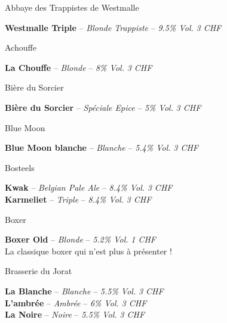 \documentclass{resume} %
\begin{document}
	\begin{rSection}{Abbaye des Trappistes de Westmalle}

	{\bf Westmalle Triple} – {\em Blonde Trappiste } – {\em 9.5\% Vol.} \hfill {\em 3 CHF} \\

	\end{rSection}

	\begin{rSection}{Achouffe}

	{\bf La Chouffe} – {\em Blonde } – {\em 8\% Vol.} \hfill {\em 3 CHF} \\

	\end{rSection}

	\begin{rSection}{Bière du Sorcier}

	{\bf Bière du Sorcier} – {\em Spéciale Epice } – {\em 5\% Vol.} \hfill {\em 3 CHF} \\

	\end{rSection}

	\begin{rSection}{Blue Moon}

	{\bf Blue Moon blanche} – {\em Blanche } – {\em 5.4\% Vol.} \hfill {\em 3 CHF} \\

	\end{rSection}

	\begin{rSection}{Bosteels}

	{\bf Kwak} – {\em Belgian Pale Ale } – {\em 8.4\% Vol.} \hfill {\em 3 CHF} \\

	{\bf Karmeliet} – {\em Triple } – {\em 8.4\% Vol.} \hfill {\em 3 CHF} \\

	\end{rSection}

	\begin{rSection}{Boxer}

	{\bf Boxer Old} – {\em Blonde } – {\em 5.2\% Vol.} \hfill {\em 1 CHF} \\
	La classique boxer qui n'est plus à présenter ! \\

	\end{rSection}

	\begin{rSection}{Brasserie du Jorat}

	{\bf La Blanche} – {\em Blanche } – {\em 5.5\% Vol.} \hfill {\em 3 CHF} \\

	{\bf L'ambrée} – {\em Ambrée } – {\em 6\% Vol.} \hfill {\em 3 CHF} \\

	{\bf La Noire} – {\em Noire } – {\em 5.5\% Vol.} \hfill {\em 3 CHF} \\

	\end{rSection}
\end{document}
